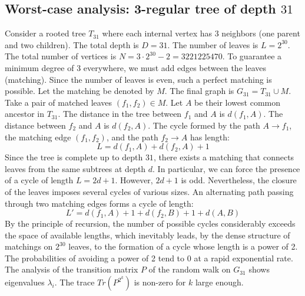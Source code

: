 \documentclass[11pt,a4paper]{article}
\begin{document}
\subsection{Worst-case analysis: 3-regular tree of depth $31$}
Consider a rooted tree $T_{31}$ where each internal vertex has 3 neighbors (one parent and two children).
The total depth is $D = 31$.
The number of leaves is $L = 2^{30}$.
The total number of vertices is $N = 3 \cdot 2^{30} - 2 = 3221225470$.
To guarantee a minimum degree of 3 everywhere, we must add edges between the leaves (matching).
Since the number of leaves is even, such a perfect matching is possible.
Let the matching be denoted by $M$. The final graph is $G_{31} = T_{31} \cup M$.
Take a pair of matched leaves $(f_1, f_2) \in M$.
Let $A$ be their lowest common ancestor in $T_{31}$.
The distance in the tree between $f_1$ and $A$ is $d(f_1, A)$.
The distance between $f_2$ and $A$ is $d(f_2, A)$.
The cycle formed by the path $A \to f_1$, the matching edge $(f_1, f_2)$, and the path $f_2 \to A$ has length:
$$ L = d(f_1, A) + d(f_2, A) + 1 $$
Since the tree is complete up to depth $31$, there exists a matching that connects leaves from the same subtrees at depth $d$.
In particular, we can force the presence of a cycle of length $L = 2d + 1$. However, $2d+1$ is odd.
Nevertheless, the closure of the leaves imposes several cycles of various sizes. An alternating path passing through two matching edges forms a cycle of length:
$$ L' = d(f_1, A) + 1 + d(f_2, B) + 1 + d(A, B) $$
By the principle of recursion, the number of possible cycles considerably exceeds the space of available lengths, which inevitably leads, by the dense structure of matchings on $2^{30}$ leaves, to the formation of a cycle whose length is a power of 2. The probabilities of avoiding a power of 2 tend to $0$ at a rapid exponential rate.
The analysis of the transition matrix $P$ of the random walk on $G_{31}$ shows eigenvalues $\lambda_i$. The trace $Tr(P^{2^k})$ is non-zero for $k$ large enough.
\end{document}
